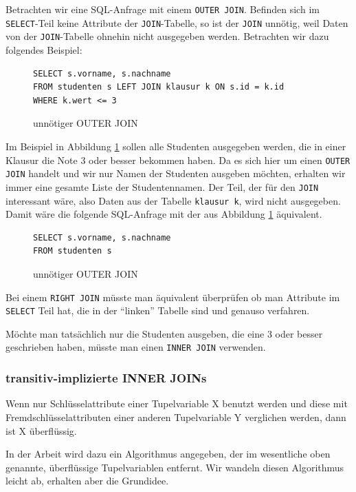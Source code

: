 Betrachten wir eine SQL-Anfrage mit einem \verb|OUTER JOIN|. Befinden sich im \verb|SELECT|-Teil keine Attribute der \verb|JOIN|-Tabelle, so ist der \verb|JOIN| unnötig, weil Daten von der \verb|JOIN|-Tabelle ohnehin nicht ausgegeben werden. Betrachten wir dazu folgendes Beispiel:

\begin{figure}[h]\label{joinelem1}
\begin{lstlisting}[mathescape]
SELECT s.vorname, s.nachname 
FROM studenten s LEFT JOIN klausur k ON s.id = k.id 
WHERE k.wert <= 3
\end{lstlisting}
\caption{unnötiger OUTER JOIN}
\end{figure}

Im Beispiel in Abbildung \ref{joinelem1} sollen alle Studenten ausgegeben werden, die in einer Klausur die Note 3 oder besser bekommen haben. Da es sich hier um einen \verb|OUTER JOIN| handelt und wir nur Namen der Studenten ausgeben möchten, erhalten wir immer eine gesamte Liste der Studentennamen. Der Teil, der für den \verb|JOIN| interessant wäre, also Daten aus der Tabelle \verb|klausur k|, wird nicht ausgegeben. Damit wäre die folgende SQL-Anfrage mit der aus Abbildung \ref{joinelem1} äquivalent.

\begin{figure}[h]\label{joinelem2}
\begin{lstlisting}[mathescape]
SELECT s.vorname, s.nachname 
FROM studenten s 
\end{lstlisting}
\caption{unnötiger OUTER JOIN}
\end{figure}

Bei einem \verb|RIGHT JOIN| müsste man äquivalent überprüfen ob man Attribute im \verb|SELECT| Teil hat, die in der ``linken'' Tabelle sind und genauso verfahren.

Möchte man tatsächlich nur die Studenten ausgeben, die eine 3 oder besser geschrieben haben, müsste man einen \verb|INNER JOIN| verwenden.

\subsubsection{transitiv-implizierte INNER JOINs}

Wenn nur Schlüsselattribute einer Tupelvariable X benutzt werden und diese mit Fremdschlüsselattributen einer anderen Tupelvariable Y verglichen werden, dann ist X überflüssig.

In der Arbeit \cite{joinelem2} wird dazu ein Algorithmus angegeben, der im wesentliche oben genannte, überflüssige Tupelvariablen entfernt. Wir wandeln diesen Algorithmus leicht ab, erhalten aber die Grundidee.

